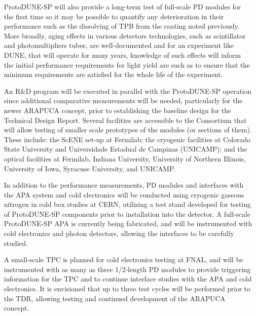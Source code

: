 ProtoDUNE-SP will also provide a long-term test of full-scale PD modules for the first time so it may be possible to quantify any deterioration in their performance such as the dissolving of TPB from the coating noted previously. 
More broadly, aging effects in various detectors technologies, such as scintillator and photomultipliers tubes, are well-documented and for an experiment like DUNE, that will operate for many years, knowledge of such effects will inform the initial performance requirements for light yield are such as to ensure that the minimum requirements are satisfied for the whole life of the experiment.

An R\&D program will be executed in parallel with the ProtoDUNE-SP operation since additional comparative measurements will be needed, particularly for the newer ARAPUCA concept, prior to establishing the baseline design for the Technical Design Report.
Several facilities are accessible to the Consortium that will allow testing of smaller scale prototypes of the modules (or sections of them). 
These include: the ScENE set-up at Fermilab; the cryogenic facilities at Colorado State University and Universidade Estadual de Campinas (UNICAMP); and the optical facilities at Fermilab, Indiana University, University of Northern Illinois, University of Iowa, Syracuse University, and UNICAMP.


In addition to the performance measurements, PD modules and interfaces with the APA system and cold electronics will be conducted using cryogenic gaseous nitrogen in cold box studies at CERN, utilizing a test stand developed for testing of ProtoDUNE-SP components prior to installation into the detector.  A full-scale ProtoDUNE-SP APA is currently being fabricated, and will be instrumented with cold electronics and photon detectors, allowing the interfaces to be carefully studied.

A small-scale TPC is planned for cold electronics testing at FNAL, and will be instrumented with as many as three 1/2-length PD modules to provide triggering information for the TPC and to continue interface studies with the APA and cold electronics.  It is envisioned that up to three test cycles will be performed prior to the TDR, allowing testing and continued development of the ARAPUCA concept.

